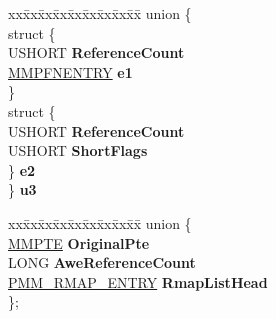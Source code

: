 \begin{DoxyCompactItemize}
\begin{tabbing}
\end{tabbing}\item 
\mbox{\label{struct___m_m_p_f_n_aee47bd8d0f8822e360a0e0b075b222e2}} 
\begin{tabbing}
xx\=xx\=xx\=xx\=xx\=xx\=xx\=xx\=xx\=\kill
union \{\\
\mbox{\label{union___m_m_p_f_n_1_1_0D1446_ab66d188dc0ee9e4f4c6fd8f0638b8091}} 
\>struct \{\\
\>\>USHORT {\bfseries ReferenceCount}\\
\>\>\hyperlink{struct___m_m_p_f_n_e_n_t_r_y}{MMPFNENTRY} {\bfseries e1}\\
\>\} \\
\>struct \{\\
\>\>USHORT {\bfseries ReferenceCount}\\
\>\>USHORT {\bfseries ShortFlags}\\
\>\} {\bfseries e2}\\
\} {\bfseries u3}\\

\end{tabbing}\item 
\mbox{\label{struct___m_m_p_f_n_a6076d3e60969ff83cb54e08ab0cc47c7}} 
\begin{tabbing}
xx\=xx\=xx\=xx\=xx\=xx\=xx\=xx\=xx\=\kill
union \{\\
\>\hyperlink{struct___m_m_p_t_e}{MMPTE} {\bfseries OriginalPte}\\
\>LONG {\bfseries AweReferenceCount}\\
\>\hyperlink{struct___m_m___r_m_a_p___e_n_t_r_y}{PMM\_RMAP\_ENTRY} {\bfseries RmapListHead}\\
\}; \\


\end{tabbing}
\end{DoxyCompactItemize}
